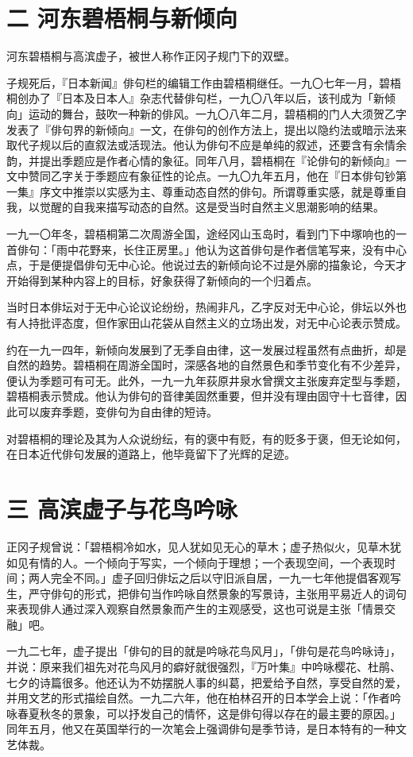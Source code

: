 \section*{\FS 二 河东碧梧桐与新倾向}

{\FS
    河东碧梧桐与高滨虚子，被世人称作正冈子规门下的双壁。

    子规死后，『日本新闻』俳句栏的编辑工作由碧梧桐继任。一九〇七年一月，碧梧桐创办了『日本及日本人』杂志代替俳句栏，一九〇八年以后，该刊成为「新倾向」运动的舞台，鼓吹一种新的俳风。一九〇八年二月，碧梧桐的门人大须贺乙字发表了『俳句界的新倾向』一文，在俳句的创作方法上，提出以隐约法或暗示法来取代子规以后的直叙法或活现法。他认为俳句不应是单纯的叙述，还要含有余情余韵，并提出季题应是作者心情的象征。同年八月，碧梧桐在『论俳句的新倾向』一文中赞同乙字关于季题应有象征性的论点。一九〇九年五月，他在『日本俳句钞第一集』序文中推崇以实感为主、尊重动态自然的俳句。所谓尊重实感，就是尊重自我，以觉醒的自我来描写动态的自然。这是受当时自然主义思潮影响的结果。

    一九一〇年冬，碧梧桐第二次周游全国，途经冈山玉岛时，看到门下中塚响也的一首俳句：「雨中花野来，长住正房里。」他认为这首俳句是作者信笔写来，没有中心点，于是便提倡俳句无中心论。他说过去的新倾向论不过是外廓的描象论，今天才开始得到某种内容上的目标，好象获得了新倾向的一个归着点。

    当时日本俳坛对于无中心论议论纷纷，热闹非凡，乙字反对无中心论，俳坛以外也有人持批评态度，但作家田山花袋从自然主义的立场出发，对无中心论表示赞成。

    约在一九一四年，新倾向发展到了无季自由律，这一发展过程虽然有点曲折，却是自然的趋势。碧梧桐在周游全国时，深感各地的自然景色和季节变化有不少差异，便认为季题可有可无。此外，一九一九年荻原井泉水曾撰文主张废弃定型与季题，碧梧桐表示赞成。他认为俳句的音律美固然重要，但并没有理由固守十七音律，因此可以废弃季题，变俳句为自由律的短诗。

    对碧梧桐的理论及其为人众说纷纭，有的褒中有贬，有的贬多于褒，但无论如何，在日本近代俳句发展的道路上，他毕竟留下了光辉的足迹。
}

\section*{\FS 三 高滨虚子与花鸟吟咏}

{\FS
    正冈子规曾说：「碧梧桐冷如水，见人犹如见无心的草木；虚子热似火，见草木犹如见有情的人。一个倾向于写实，一个倾向于理想；一个表现空间，一个表现时间；两人完全不同。」虚子回归俳坛之后以守旧派自居，一九一七年他提倡客观写生，严守俳句的形式，把俳句当作吟咏自然景象的写景诗，主张用平易近人的词句来表现俳人通过深入观察自然景象而产生的主观感受，这也可说是主张「情景交融」吧。

    一九二七年，虚子提出「俳句的目的就是吟咏花鸟风月」，「俳句是花鸟吟咏诗」，并说：原来我们祖先对花鸟风月的癖好就很强烈，『万叶集』中吟咏樱花、杜鹃、七夕的诗篇很多。他还认为不妨摆脱人事的纠葛，把爱给予自然，享受自然的爱，并用文艺的形式描绘自然。一九二六年，他在柏林召开的日本学会上说：「作者吟咏春夏秋冬的景象，可以抒发自己的情怀，这是俳句得以存在的最主要的原因。」同年五月，他又在英国举行的一次笔会上强调俳句是季节诗，是日本特有的一种文艺体裁。
}

